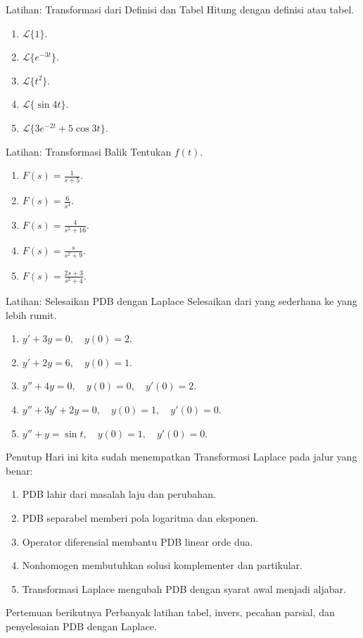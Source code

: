 \documentclass[aspectratio=169,11pt]{beamer}
\newcommand{\Lap}{\mathcal{L}}
\begin{document}
\begin{frame}{Latihan: Transformasi dari Definisi dan Tabel}
Hitung dengan definisi atau tabel.
\begin{enumerate}
  \item $\displaystyle \Lap\{1\}$.
  \item $\displaystyle \Lap\{e^{-3t}\}$.
  \item $\displaystyle \Lap\{t^2\}$.
  \item $\displaystyle \Lap\{\sin 4t\}$.
  \item $\displaystyle \Lap\{3e^{-2t}+5\cos 3t\}$.
\end{enumerate}
\end{frame}

\begin{frame}{Latihan: Transformasi Balik}
Tentukan $f(t)$.
\begin{enumerate}
  \item $\displaystyle F(s)=\frac{1}{s+5}$.
  \item $\displaystyle F(s)=\frac{6}{s^4}$.
  \item $\displaystyle F(s)=\frac{4}{s^2+16}$.
  \item $\displaystyle F(s)=\frac{s}{s^2+9}$.
  \item $\displaystyle F(s)=\frac{2s+3}{s^2+4}$.
\end{enumerate}
\end{frame}

\begin{frame}{Latihan: Selesaikan PDB dengan Laplace}
Selesaikan dari yang sederhana ke yang lebih rumit.
\begin{enumerate}
  \item $y'+3y=0,\quad y(0)=2$.
  \item $y'+2y=6,\quad y(0)=1$.
  \item $y''+4y=0,\quad y(0)=0,\quad y'(0)=2$.
  \item $y''+3y'+2y=0,\quad y(0)=1,\quad y'(0)=0$.
  \item $y''+y=\sin t,\quad y(0)=1,\quad y'(0)=0$.
\end{enumerate}
\end{frame}

\begin{frame}{Penutup}
Hari ini kita sudah menempatkan Transformasi Laplace pada jalur yang benar:
\begin{enumerate}
  \item PDB lahir dari masalah laju dan perubahan.
  \item PDB separabel memberi pola logaritma dan eksponen.
  \item Operator diferensial membantu PDB linear orde dua.
  \item Nonhomogen membutuhkan solusi komplementer dan partikular.
  \item Transformasi Laplace mengubah PDB dengan syarat awal menjadi aljabar.
\end{enumerate}
\begin{alertblock}{Pertemuan berikutnya}
Perbanyak latihan tabel, invers, pecahan parsial, dan penyelesaian PDB dengan Laplace.
\end{alertblock}
\end{frame}
\end{document}

